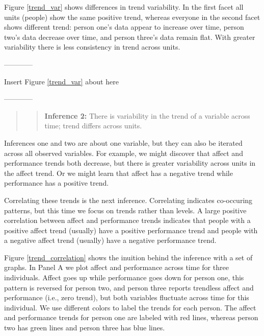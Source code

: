 \documentclass[english,,man]{apa6}
\theoremstyle{definition}
\theoremstyle{definition}
\theoremstyle{definition}
\theoremstyle{remark}
\begin{document}
Figure \ref{trend_var} shows differences in trend variability. In the
first facet all units (people) show the same positive trend, whereas
everyone in the second facet shows different trend: person one's data
appear to increase over time, person two's data decrease over time, and
person three's data remain flat. With greater variability there is less
consistency in trend across units.

\begin{center}

------------

Insert Figure \ref{trend_var} about here

------------

\end{center}

\begin{quote}
\begin{quote}
\textbf{Inference 2:} There is variability in the trend of a variable
across time; trend differs across units.
\end{quote}
\end{quote}

Inferences one and two are about one variable, but they can also be
iterated across all observed variables. For example, we might discover
that affect and performance trends both decrease, but there is greater
variability across units in the affect trend. Or we might learn that
affect has a negative trend while performance has a positive trend.

Correlating these trends is the next inference. Correlating indicates
co-occuring patterns, but this time we focus on trends rather than
levels. A large positive correlation between affect and performance
trends indicates that people with a positive affect trend (usually) have
a positive performance trend and people with a negative affect trend
(usually) have a negative performance trend.

Figure \ref{trend_correlation} shows the inuition behind the inference
with a set of graphs. In Panel A we plot affect and performance across
time for three individuals. Affect goes up while performance goes down
for person one, this pattern is reversed for person two, and person
three reports trendless affect and performance (i.e., zero trend), but
both variables fluctuate across time for this individual. We use
different colors to label the trends for each person. The affect and
performance trends for person one are labeled with red lines, whereas
person two has green lines and person three has blue lines.
\end{document}
